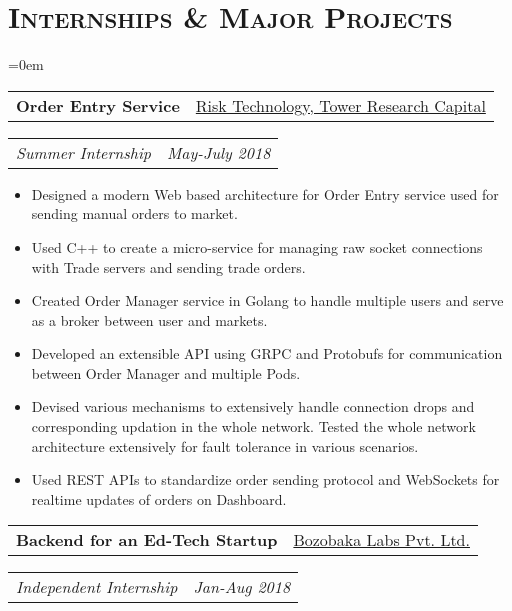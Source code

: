 \documentclass{article}
\makeatletter
\newcommand{\headerrow}[2]
{\begin{tabular*}{\linewidth}{l@{\extracolsep{\fill}}r}
    #1 &
    #2 \\
\end{tabular*}}
\newcommand{\tmpsection}[1]{}
\let\tmpsection=\section
\renewcommand{\section}[1]{\tmpsection*{\textsc{#1}}}
\makeatother
\begin{document}
\section{Internships \& Major Projects}
\begin{list} {}{\leftmargin=0em}
\setlength{\leftmargin}{0pt}

    \item[]
    \headerrow {\textbf{Order Entry Service}}{\underline{Risk Technology, Tower Research Capital}}
    \headerrow {\emph{Summer Internship}}{\emph{May-July 2018}}
    \begin{itemize}
    \setlength\itemsep{0.0em}
    \item Designed a modern Web based architecture for Order Entry service used for sending manual orders to market.
    \item Used C++ to create a micro-service for managing raw socket connections with Trade servers and sending trade orders. 
    \item Created Order Manager service in Golang to handle multiple users and serve as a broker between user and markets.
    \item Developed an extensible API using GRPC and Protobufs for communication between Order Manager and multiple Pods.
    \item Devised various mechanisms to extensively handle connection drops and corresponding updation in the whole network. Tested the whole network architecture extensively for fault tolerance in various scenarios.
    \item Used REST APIs to standardize order sending protocol and WebSockets for realtime updates of orders on Dashboard.
    \end{itemize}
    \item[]
    \headerrow {\textbf{Backend for an Ed-Tech Startup}}{\underline{Bozobaka Labs Pvt. Ltd.}}
    \headerrow {\emph{Independent Internship}}{\emph{Jan-Aug 2018}}

\end{list}
\end{document}
